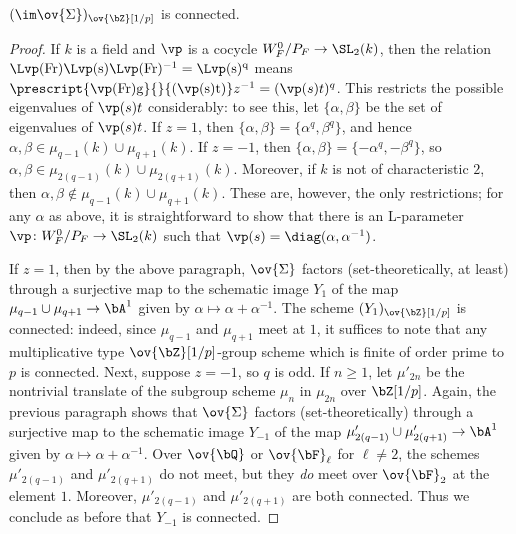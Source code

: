 \begin{claim}\label{claim:conn-image}
    $(\im \ov{\Sigma})_{\ov{\bZ}[1/p]}$ is connected.
\end{claim}

\begin{proof}
    If $k$ is a field and $\vp$ is a cocycle $W_F^0/P_F \to \SL_2(k)$, then the relation $\Lvp(\rm{Fr})\Lvp(s)\Lvp(\rm{Fr})^{-1} = \Lvp(s)^q$ means $\prescript{\vp(\rm{Fr})g}{}{(\vp(s)t)}z^{-1} = (\vp(s)t)^q$. This restricts the possible eigenvalues of $\vp(s)t$ considerably: to see this, let $\{\alpha, \beta\}$ be the set of eigenvalues of $\vp(s)t$. If $z = 1$, then $\{\alpha, \beta\} = \{\alpha^q, \beta^q\}$, and hence $\alpha, \beta \in \mu_{q - 1}(k) \cup \mu_{q + 1}(k)$. If $z = -1$, then $\{\alpha, \beta\} = \{-\alpha^q, -\beta^q\}$, so $\alpha, \beta \in \mu_{2(q-1)}(k) \cup \mu_{2(q+1)}(k)$. Moreover, if $k$ is not of characteristic $2$, then $\alpha, \beta \not\in \mu_{q-1}(k) \cup \mu_{q+1}(k)$. These are, however, the only restrictions; for any $\alpha$ as above, it is straightforward to show that there is an L-parameter $\vp\colon W_F^0/P_F \to \SL_2(k)$ such that $\vp(s) = \diag(\alpha, \alpha^{-1})$. \smallskip

    If $z = 1$, then by the above paragraph, $\ov{\Sigma}$ factors (set-theoretically, at least) through a surjective map to the schematic image $Y_1$ of the map $\mu_{q-1} \cup \mu_{q+1} \to \bA^1$ given by $\alpha \mapsto \alpha + \alpha^{-1}$. The scheme $(Y_1)_{\ov{\bZ}[1/p]}$ is connected: indeed, since $\mu_{q-1}$ and $\mu_{q+1}$ meet at $1$, it suffices to note that any multiplicative type $\ov{\bZ}[1/p]$-group scheme which is finite of order prime to $p$ is connected. Next, suppose $z = -1$, so $q$ is odd. If $n \geq 1$, let $\mu'_{2n}$ be the nontrivial translate of the subgroup scheme $\mu_n$ in $\mu_{2n}$ over $\bZ[1/p]$. Again, the previous paragraph shows that $\ov{\Sigma}$ factors (set-theoretically) through a surjective map to the schematic image $Y_{-1}$ of the map $\mu'_{2(q-1)} \cup \mu'_{2(q+1)} \to \bA^1$ given by $\alpha \mapsto \alpha + \alpha^{-1}$. Over $\ov{\bQ}$ or $\ov{\bF}_{\ell}$ for $\ell \neq 2$, the schemes $\mu'_{2(q-1)}$ and $\mu'_{2(q+1)}$ do not meet, but they \textit{do} meet over $\ov{\bF}_2$ at the element $1$. Moreover, $\mu'_{2(q-1)}$ and $\mu'_{2(q+1)}$ are both connected. Thus we conclude as before that $Y_{-1}$ is connected.
\end{proof}























